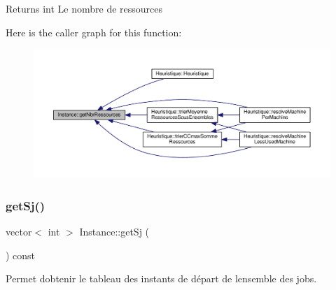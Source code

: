 \begin{DoxyReturn}{Returns}
int Le nombre de ressources 
\end{DoxyReturn}
Here is the caller graph for this function\+:\nopagebreak
\begin{figure}[H]
\begin{center}
\leavevmode
\includegraphics[width=350pt]{classInstance_aa69a89ba7a29d4ca426ffe4b1922cac6_icgraph}
\end{center}
\end{figure}
\mbox{\label{classInstance_a2c11032145489a3a90d3b9f1e3dfd2d4}} 
\subsubsection{\texorpdfstring{get\+Sj()}{getSj()}}
{\footnotesize\ttfamily vector$<$ int $>$ Instance\+::get\+Sj (\begin{DoxyParamCaption}{ }\end{DoxyParamCaption}) const}



Permet d\textquotesingle{}obtenir le tableau des instants de départ de l\textquotesingle{}ensemble des jobs. 

